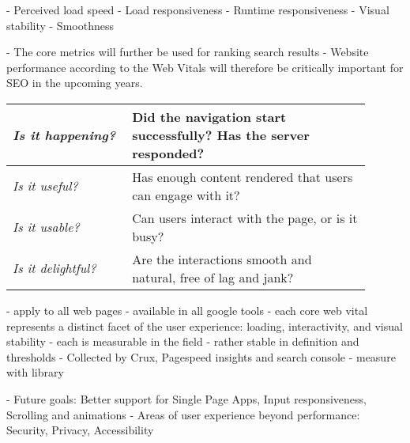 
- Perceived load speed
- Load responsiveness
- Runtime responsiveness
- Visual stability
- Smoothness





- The core metrics will further be used for ranking search results 
- Website performance according to the Web Vitals will therefore be critically important for SEO in the upcoming years.




 
 \begin{center}
\small
	\begin{tabular}{ | p{0.3\linewidth} | p{0.6\linewidth} | }
	\hline
	\textit{Is it happening?} & 	Did the navigation start successfully? Has the server responded? \\
	\hline
	\textit{Is it useful?} & Has enough content rendered that users can engage with it? \\
	\hline
	\textit{Is it usable?} & Can users interact with the page, or is it busy? \\
	\hline
	\textit{Is it delightful?} & Are the interactions smooth and natural, free of lag and jank? \\
	\hline
	\end{tabular}
\end{center}







- apply to all web pages
- available in all google tools
- each core web vital  represents a distinct facet of the user experience: loading, interactivity, and visual stability
- each is measurable in the field
- rather stable in definition and thresholds
- Collected by Crux, Pagespeed insights and search console
- measure with library %




- Future goals: Better support for Single Page Apps, Input responsiveness, Scrolling and animations
- Areas of user experience beyond performance: Security, Privacy, Accessibility

